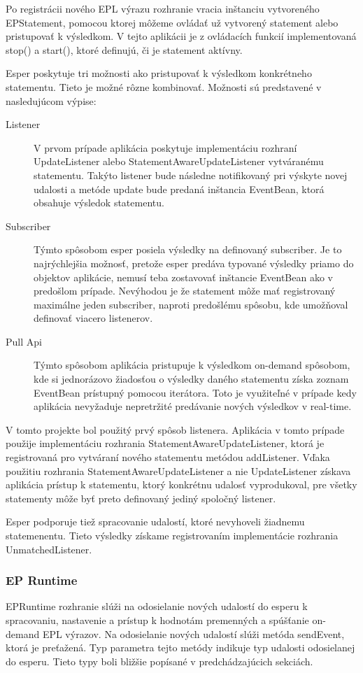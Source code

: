 		Po registrácii nového EPL výrazu rozhranie vracia inštanciu vytvoreného EPStatement, pomocou ktorej môžeme ovládať už vytvorený statement alebo pristupovať k výsledkom. V tejto aplikácii je z ovládacích funkcií implementovaná stop() a start(), ktoré definujú, či je statement aktívny.
		
		Esper poskytuje tri možnosti ako pristupovať k výsledkom konkrétneho statementu. Tieto je možné rôzne kombinovať. Možnosti sú predstavené v nasledujúcom výpise:
		\begin{description}
			\item[Listener] V prvom prípade aplikácia poskytuje implementáciu rozhraní UpdateListener alebo StatementAwareUpdateListener vytváranému statementu. Takýto listener bude následne notifikovaný pri výskyte novej udalosti a metóde update bude predaná inštancia EventBean, ktorá obsahuje výsledok statementu.
			\item[Subscriber] Týmto spôsobom esper posiela výsledky na definovaný subscriber. Je to najrýchlejšia možnosť, pretože esper predáva typované výsledky priamo do objektov aplikácie, nemusí teba zostavovať inštancie EventBean ako v predošlom prípade. Nevýhodou je že statement môže mať registrovaný maximálne jeden subscriber, naproti predošlému spôsobu, kde umožňoval definovať viacero listenerov.
			\item[Pull Api] Týmto spôsobom aplikácia pristupuje k výsledkom on-demand spôsobom, kde si jednorázovo žiadosťou o výsledky daného statementu získa zoznam EventBean prístupný pomocou iterátora. Toto je využiteľné v prípade kedy aplikácia nevyžaduje nepretržité predávanie nových výsledkov v real-time.
		\end{description}
		V tomto projekte bol použitý prvý spôsob listenera. Aplikácia v tomto prípade použije implementáciu rozhrania StatementAwareUpdateListener, ktorá je registrovaná pro vytváraní nového statementu metódou addListener. Vďaka použitiu rozhrania StatementAwareUpdateListener a nie UpdateListener získava aplikácia prístup k statementu, ktorý konkrétnu udalosť vyprodukoval, pre všetky statementy môže byť preto definovaný jediný spoločný listener.
		
		Esper podporuje tiež spracovanie udalostí, ktoré nevyhoveli žiadnemu statemenentu. Tieto výsledky získame registrovaním implementácie rozhrania UnmatchedListener. 
		
		\subsubsection{EP Runtime}
		EPRuntime rozhranie slúži na odosielanie nových udalostí do esperu k spracovaniu, nastavenie a prístup k hodnotám premenných a spúšťanie on-demand EPL výrazov. Na odosielanie nových udalostí slúži metóda sendEvent, ktorá je preťažená. Typ parametra tejto metódy indikuje typ udalosti odosielanej do esperu. Tieto typy boli bližšie popísané v predchádzajúcich sekciách.
		
